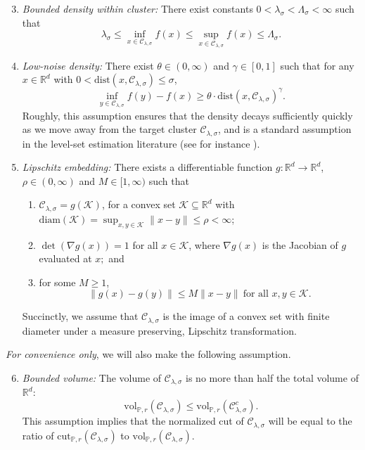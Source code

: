 \documentclass[11pt,twoside]{article}
\newcommand{\Reals}{\mathbb{R}}
\newcommand{\1}{\mathbf{1}}
\newcommand{\Rd}{\Reals^d}
\newcommand{\mc}[1]{\mathcal{#1}}
\newcommand{\Pbb}{\mathbb{P}}
\newcommand{\dist}{\mathrm{dist}}
\newcommand{\vol}{\mathrm{vol}}
\newcommand{\cut}{\mathrm{cut}}
\begin{document}
\begin{enumerate}[label=(A\arabic*)]
	\setcounter{enumi}{2}
	\item
	\label{asmp:lambda_bounded_density}
	\emph{Bounded density within cluster:} There exist constants
	$0<\lambda_{\sigma}< \Lambda_{\sigma}<\infty$ such that 
	$$
	\lambda_{\sigma} \leq \inf_{x \in \mc{C}_{\lambda,\sigma}} f(x) \leq \sup_{x \in \mc{C}_{\lambda,\sigma}} f(x)
	\leq \Lambda_{\sigma}.
	$$
	
	\item 
	\label{asmp:low_noise_density}
	\emph{Low-noise density:} There exist $\theta \in (0,\infty)$ and $\gamma \in
	[0,1]$ such that for any $x \in \Rd$ with $0 < \dist(x, \mc{C}_{\lambda,\sigma}) \leq \sigma$,     
	$$
	\inf_{y \in \mc{C}_{\lambda,\sigma}} f(y) - f(x) \geq  \theta \cdot \dist(x, \mc{C}_{\lambda,\sigma})^{\gamma}.  
	$$
	Roughly, this assumption ensures that the density decays sufficiently quickly
	as we move away from the target cluster $\mc{C}_{\lambda,\sigma}$, and is a standard assumption in the level-set estimation literature (see for instance \citet{singh2009}).
	
	\item
	\label{asmp:embedding}
	\emph{Lipschitz embedding:}
	There exists a differentiable function $g: \Rd \to \Rd$, $\rho \in (0,\infty)$ and $M \in [1,\infty)$ such that
	\begin{enumerate}
		\item $\mc{C}_{\lambda,\sigma} = g(\mc{K})$, for a convex set $\mc{K} \subseteq \Rd$ with $\mathrm{diam}(\mc{K}) = \sup_{x,y \in \mc{K}}\|x - y\| \leq \rho < \infty$;
		\item $\det(\nabla g (x)) = 1$ for all $x \in \mc{K}$, where $\nabla g(x)$ is the Jacobian of $g$ evaluated at $x;$ and 
		\item for some $M \geq 1$,   
		$$
		\|g(x) - g(y)\| \leq M \|x - y\| ~	\text{for all $x,y \in \mc{K}$}. 
		$$
	\end{enumerate}
	Succinctly, we assume that $\mc{C}_{\lambda,\sigma}$ is the image of a convex set with finite
	diameter under a measure preserving, Lipschitz transformation. 
\end{enumerate}

\emph{For convenience only}, we will also make the following assumption.
\begin{enumerate}[label=(A\arabic*)]
	\setcounter{enumi}{5}
	\item
	\label{asmp:bounded_volume}
	\emph{Bounded volume:}
	The volume of $\mc{C}_{\lambda,\sigma}$ is no more than half the total volume of $\Rd$:
	$$
	\vol_{\Pbb,r}(\mc{C}_{\lambda,\sigma}) \leq \vol_{\Pbb,r}(\mc{C}_{\lambda,\sigma}^c). 
	$$
	This assumption implies that the normalized cut of $\mc{C}_{\lambda,\sigma}$ will be equal to the ratio of $\cut_{\Pbb,r}(\mc{C}_{\lambda,\sigma})$ to $\vol_{\Pbb,r}(\mc{C}_{\lambda,\sigma})$.
\end{enumerate}
\end{document}
